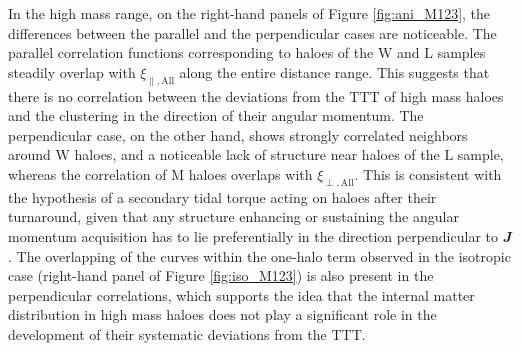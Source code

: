 \documentclass[fleqn,usenatbib]{mnras}
\newcommand{\Wh}{\mathrm{W}}
\newcommand{\Lh}{\mathrm{L}}
\newcommand{\Mh}{\mathrm{M}}
\begin{document}
In the high mass range, on the right-hand panels of Figure \ref{fig:ani_M123}, the differences between the parallel and the perpendicular cases are noticeable. The parallel correlation functions corresponding to haloes of the $\Wh$ and $\Lh$ samples steadily overlap with $\xi_\mathrm{\parallel,All}$ along the entire distance range. This suggests that there is no correlation between the deviations from the TTT of high mass haloes and the clustering in the direction of their angular momentum. The perpendicular case, on the other hand, shows strongly correlated neighbors around $\Wh$ haloes, and a noticeable lack of structure near haloes of the $\Lh$ sample, whereas the correlation of $\Mh$ haloes overlaps with $\xi_\mathrm{\perp,All}$. This is consistent with the hypothesis of a secondary tidal torque acting on haloes after their turnaround, given that any structure enhancing or sustaining the angular momentum acquisition has to lie preferentially in the direction perpendicular to $\mathbfit{J}$. The overlapping of the curves within the one-halo term observed in the isotropic case (right-hand panel of Figure \ref{fig:iso_M123}) is also present in the perpendicular correlations, which supports the idea that the internal matter distribution in high mass haloes does not play a significant role in the development of their systematic deviations from the TTT.
\end{document}
